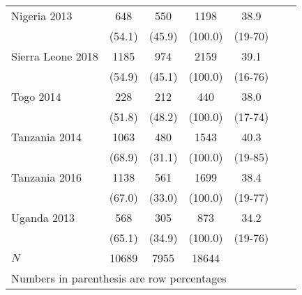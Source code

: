 \begin{tabular}{l*{6}{c}}
Nigeria 2013&                  {648}&                {550}&           {1198}&             {38.9}\\
&                                              {(54.1)}&      {(45.9)}&             {(100.0)}&           {(19-70)}\\
Sierra Leone 2018&             {1185}&                {974}&           {2159}&             {39.1}\\
&                                              {(54.9)}&      {(45.1)}&             {(100.0)}&           {(16-76)}\\
Togo 2014&                             {228}&                {212}&           {440}&             {38.0}\\
&                                              {(51.8)}&      {(48.2)}&             {(100.0)}&           {(17-74)}\\
Tanzania 2014&                 {1063}&               {480}&           {1543}&             {40.3}\\
&                                              {(68.9)}&     {(31.1)}&             {(100.0)}&           {(19-85)}\\
Tanzania 2016&                 {1138}&               {561}&           {1699}&             {38.4}\\
&                                              {(67.0)}&     {(33.0)}&             {(100.0)}&           {(19-77)}\\
Uganda 2013&                   {568}&               {305}&           {873}&             {34.2}\\
&                                              {(65.1)}&     {(34.9)}&             {(100.0)}&           {(19-76)}\\
\hline
\(N\)                          &       {10689}                &  {7955} &    {18644} &            {}\\
\hline\hline
\multicolumn{6}{l}{\footnotesize Numbers in parenthesis are row percentages}\\
\end{tabular}
